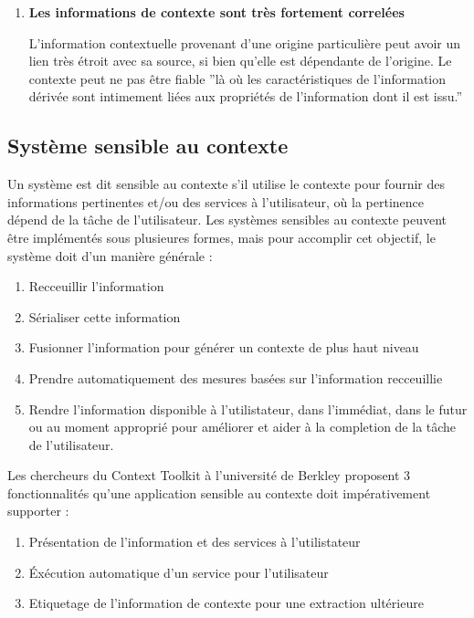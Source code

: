 \begin{enumerate}
    \item \textbf{Les informations de contexte sont très fortement correlées}

	    L'information contextuelle provenant d'une origine particulière peut
	    avoir un lien très étroit avec sa source, si bien qu'elle est
	    dépendante de l'origine.
	    Le contexte peut ne pas être fiable ''là où les caractéristiques de
	    l'information dérivée sont intimement liées aux propriétés de
	    l'information dont il est issu.'' \cite{catharina_context_2002}

\end{enumerate}

\subsection{Système sensible au contexte}

Un système est dit sensible au contexte s'il utilise le contexte pour fournir
des informations pertinentes et/ou des services à l'utilisateur, où la
pertinence dépend de la tâche de l'utilisateur. Les systèmes sensibles au
contexte peuvent être implémentés sous plusieures formes, mais pour accomplir
cet objectif, le système doit d'un manière générale :

\begin{enumerate}
  \item Recceuillir l'information
  \item Sérialiser cette information
  \item Fusionner l'information pour générer un contexte de plus haut niveau
  \item Prendre automatiquement des mesures basées sur l'information recceuillie
  \item Rendre l'information disponible à l'utilistateur, dans l'immédiat, dans
	  le futur ou au moment approprié pour améliorer et aider à la
	  completion de la tâche de l'utilisateur.
\end{enumerate}

Les chercheurs du Context Toolkit à l'université de Berkley proposent 3
fonctionnalités qu'une application sensible au contexte doit impérativement
supporter : \cite{dey_providing_2000}

\begin{enumerate}
  \item Présentation de l'information et des services à l'utilistateur
  \item Éxécution automatique d'un service pour l'utilisateur
  \item Etiquetage de l'information de contexte pour une extraction ultérieure
\end{enumerate}

